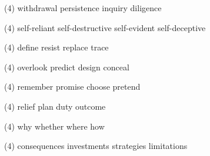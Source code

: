 \begin{tasks}(4)
	\task withdrawal
	\task persistence
	\task inquiry
	\task diligence
\end{tasks}
\item
\begin{tasks}(4)
	\task self-reliant
	\task self-destructive
	\task self-evident
	\task self-deceptive
\end{tasks}
\item
\begin{tasks}(4)
	\task define
	\task resist
	\task replace
	\task trace
\end{tasks}
\item
\begin{tasks}(4)
	\task overlook
	\task predict
	\task design
	\task conceal
\end{tasks}
\item
\begin{tasks}(4)
	\task remember
	\task promise
	\task choose
	\task pretend
\end{tasks}
\item
\begin{tasks}(4)
	\task relief
	\task plan
	\task duty
	\task outcome
\end{tasks}
\item
\begin{tasks}(4)
	\task why
	\task whether
	\task where
	\task how
\end{tasks}
\item
\begin{tasks}(4)
	\task consequences
	\task investments
	\task strategies
	\task limitations
\end{tasks}